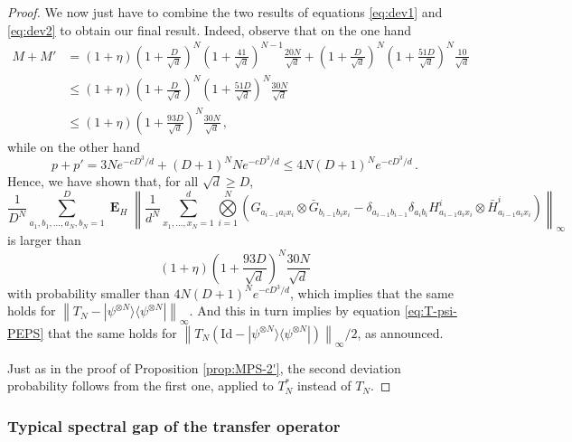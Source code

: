 \documentclass{amsart}
\renewcommand{\leq}{\leqslant}
\renewcommand{\geq}{\geqslant}
\newcommand{\Id}{\mathrm{Id}}
\DeclareMathOperator{\E}{\mathbf{E}}
\newcommand{\ketbra}[2]{| #1 \rangle\!\langle #2 |}
\begin{document}
\begin{proof}
    We now just have to combine the two results of equations \eqref{eq:dev1} and \eqref{eq:dev2} to obtain our final result. Indeed, observe that on the one hand
    \begin{align*}
        M+M' & = (1+\eta)\left(1+\frac{D}{\sqrt{d}}\right)^N \left(1+\frac{41}{\sqrt{d}}\right)^{N-1}\frac{20N}{\sqrt{d}} + \left(1+\frac{D}{\sqrt{d}}\right)^N \left(1+\frac{51D}{\sqrt{d}}\right)^N\frac{10}{\sqrt{d}} \\
             & \leq (1+\eta)\left(1+\frac{D}{\sqrt{d}}\right)^N \left(1+\frac{51D}{\sqrt{d}}\right)^N\frac{30N}{\sqrt{d}}                                                                                                \\
             & \leq (1+\eta)\left(1+\frac{93D}{\sqrt{d}}\right)^N\frac{30N}{\sqrt{d}} \, ,
    \end{align*}
    while on the other hand
    \[ p+p'= 3Ne^{-cD^3/d} + (D+1)^{N} Ne^{-cD^3/d} \leq 4N(D+1)^{N}e^{-cD^3/d} \, . \]
    Hence, we have shown that, for all $\sqrt{d}\geq D$,
    \[ \frac{1}{D^N} \sum_{a_1,b_1,\ldots,a_N,b_N=1}^D \E_H\left\| \frac{1}{d^N} \sum_{x_1,\ldots,x_N=1}^d \underset{i=1}{\overset{N}{\bigotimes}}\left( G_{a_{i-1}a_ix_i} \otimes \bar{G}_{b_{i-1}b_ix_i} - \delta_{a_{i-1}b_{i-1}}\delta_{a_ib_i}H_{a_{i-1}a_ix_i}^i \otimes \bar{H}_{a_{i-1}a_ix_i}^i \right) \right\|_{\infty} \]
    is larger than
    \[ (1+\eta)\left(1+\frac{93D}{\sqrt{d}}\right)^N\frac{30N}{\sqrt{d}} \]
    with probability smaller than $4N(D+1)^{N}e^{-cD^3/d}$, which implies that the same holds for $\left\|T_N-\ketbra{\psi^{\otimes N}}{\psi^{\otimes N}}\right\|_{\infty}$. And this in turn implies by equation \eqref{eq:T-psi-PEPS} that the same holds for $\left\|T_N\left(\Id-\ketbra{\psi^{\otimes N}}{\psi^{\otimes N}}\right)\right\|_{\infty}/2$, as announced.

    Just as in the proof of Proposition \ref{prop:MPS-2'}, the second deviation probability follows from the first one, applied to $T_N^*$ instead of $T_N$.
\end{proof}

\subsubsection{Typical spectral gap of the transfer operator} \hfill\par\smallskip
\end{document}
